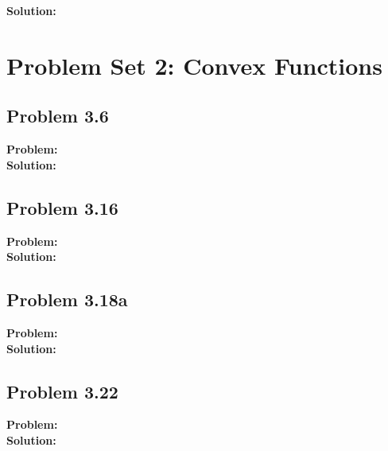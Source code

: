 \documentclass[letter]{article}
\begin{document}
\textbf{Solution:}\\





\section{Problem Set 2: Convex Functions}

\subsection{Problem 3.6}
\textbf{Problem:}\\



\textbf{Solution:}\\


\subsection{Problem 3.16}
\textbf{Problem:}\\



\textbf{Solution:}\\


\subsection{Problem 3.18a}
\textbf{Problem:}\\



\textbf{Solution:}\\


\subsection{Problem 3.22}
\textbf{Problem:}\\



\textbf{Solution:}\\
\end{document}
